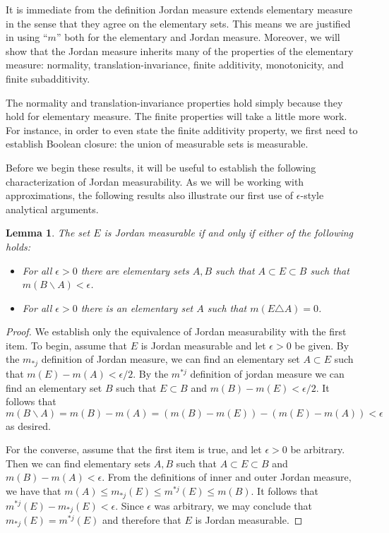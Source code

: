 \documentclass[11pt,oneside]{amsbook}
\renewcommand{\setminus}{\smallsetminus}
\theoremstyle{definition}
\theoremstyle{plain}
\newtheorem{lem}[thm]{Lemma}
\theoremstyle{definition}
\theoremstyle{remark}
\numberwithin{equation}{section}
\numberwithin{figure}{section}
\begin{document}
It is immediate from the definition Jordan measure extends elementary measure in the sense that they agree on the elementary sets. This means we are justified in using ``$m$'' both for the elementary and Jordan measure. Moreover, we will show that the Jordan measure inherits many of the properties of the elementary measure: normality, translation-invariance, finite additivity, monotonicity, and finite subadditivity.

The normality and translation-invariance properties hold simply because they hold for elementary measure. The finite properties will take a little more work. For instance, in order to even state the finite additivity property, we first need to establish Boolean closure: the union of measurable sets is measurable.

Before we begin these results, it will be useful to establish the following characterization of Jordan measurability. As we will be working with approximations, the following results also illustrate our first use of $\epsilon$-style analytical arguments.

\begin{lem}
  \label{lem:jordan-equiv}
  The set $E$ is Jordan measurable if and only if either of the following holds:
  \begin{itemize}
  \item For all $\epsilon>0$ there are elementary sets $A,B$ such that $A\subset E\subset B$ such that $m(B\setminus A)<\epsilon$.
  \item For all $\epsilon>0$ there is an elementary set $A$ such that $m(E\triangle A)=0$.
  \end{itemize}
\end{lem}

\begin{proof}
  We establish only the equivalence of Jordan measurability with the first item. To begin, assume that $E$ is Jordan measurable and let $\epsilon>0$ be given. By the $m_{*j}$ definition of Jordan measure, we can find an elementary set $A\subset E$ such that $m(E)-m(A)<\epsilon/2$. By the $m^{*j}$ definition of jordan measure we can find an elementary set $B$ such that $E\subset B$ and $m(B)-m(E)<\epsilon/2$. It follows that 
\[m(B\setminus A)=m(B)-m(A)=(m(B)-m(E))-(m(E)-m(A))<\epsilon
\]
as desired.

  For the converse, assume that the first item is true, and let $\epsilon>0$ be arbitrary. Then we can find elementary sets $A,B$ such that $A\subset E\subset B$ and $m(B)-m(A)<\epsilon$. From the definitions of inner and outer Jordan measure, we have that $m(A)\leq m_{*j}(E)\leq m^{*j}(E)\leq m(B)$. It follows that $m^{*j}(E)-m_{*j}(E)<\epsilon$. Since $\epsilon$ was arbitrary, we may conclude that $m_{*j}(E)=m^{*j}(E)$ and therefore that $E$ is Jordan measurable.
\end{proof}
\end{document}
